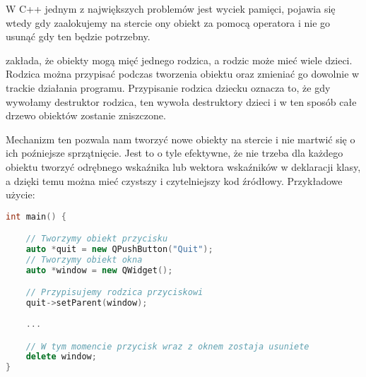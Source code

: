 
\par
W C++ jednym z największych problemów jest wyciek pamięci, pojawia się wtedy gdy zaalokujemy na stercie ony obiekt za pomocą operatora  i nie go usunąć gdy ten będzie potrzebny.
\par
{} zakłada, że obiekty mogą mięć jednego rodzica, a rodzic może mieć wiele dzieci.
Rodzica można przypisać podczas tworzenia obiektu oraz zmieniać go dowolnie w trackie działania programu.
Przypisanie rodzica dziecku oznacza to, że gdy wywołamy destruktor rodzica, ten wywoła destruktory dzieci i w ten sposób całe drzewo obiektów zostanie zniszczone.
\par
Mechanizm ten pozwala nam tworzyć nowe obiekty na stercie i nie martwić się o ich poźniejsze sprzątnięcie.
Jest to o tyle efektywne, że nie trzeba dla każdego obiektu tworzyć odrębnego wskaźnika lub wektora wskaźników w deklaracji klasy, a dzięki temu można mieć czystszy i czytelniejszy kod źródłowy.
Przykładowe użycie:
\par
\begin{lstlisting}[language=C++]
int main() {

    // Tworzymy obiekt przycisku
    auto *quit = new QPushButton("Quit");
    // Tworzymy obiekt okna
    auto *window = new QWidget();

    // Przypisujemy rodzica przyciskowi
    quit->setParent(window);
    
    ...

    // W tym momencie przycisk wraz z oknem zostaja usuniete
    delete window;
}
\end{lstlisting}